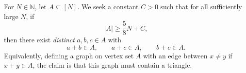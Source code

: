 For $N\in\mathbb{N}$, let $A\subseteq [N]$. We seek a constant $C>0$ such that for all sufficiently large $N$,
if
\[
|A|\ge \frac{5}{8}N + C,
\]
then there exist \emph{distinct} $a,b,c\in A$ with
\[
a+b\in A,\qquad a+c\in A,\qquad b+c\in A.
\]
Equivalently, defining a graph on vertex set $A$ with an edge between $x\ne y$ if $x+y\in A$, the claim is that this graph must contain a triangle.
